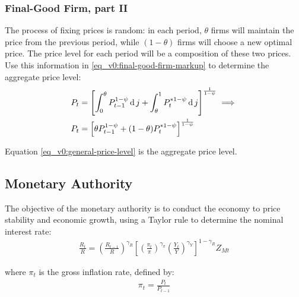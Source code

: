\documentclass[
thesis.tex
]{subfiles}
\begin{document}
	
	\subsubsection{Final-Good Firm, part II}
	
	The process of fixing prices is random: in each period, $\theta$ firms will maintain the price from the previous period, while $(1-\theta)$ firms will choose a new optimal price. The price level for each period will be a composition of these two prices. Use this information in \ref{eq_v0:final-good-firm-markup} to determine the aggregate price level:
	\begin{align}
		P_t & = \left[ \int_{0}^{\theta} P_{t-1}^{1-\psi} \operatorname{d} j + \int_{\theta}^{1} P_t^{\ast 1-\psi} \operatorname{d} j \right]^{\frac{1}{1-\psi}}  \implies \nonumber \\
		P_t & = \left[ \theta P_{t-1}^{1-\psi} + (1-\theta) P_t^{\ast 1-\psi} \right]^\frac{1}{1-\psi} \label{eq_v0:general-price-level}
	\end{align}
	
	Equation \ref{eq_v0:general-price-level} is the aggregate price level.
	
	
	\subsection{Monetary Authority}
	
	The objective of the monetary authority is to conduct the economy to price stability and economic growth, using a Taylor rule \cite{taylor_discretion_1993} to determine the nominal interest rate:
	\begin{align}
		\label{eq_v0:monetary-policy}
		\frac{R_t}{R} =
		\left( \frac{R_{t-1}}{R} \right)^{\gamma_R}  \left[
		\left( \frac{\pi_t}{\pi} \right)^{\gamma_\pi}
		\left( \frac{Y_t}{Y} \right)^{\gamma_Y} \right]^{1-\gamma_R} Z_{Mt}
	\end{align}
	
	where $\pi_t$ is the gross inflation rate, defined by:
	\begin{align}
		\pi_t = \frac{P_t}{P_{t-1}}
		\label{eq_v0:gross-inflation-rate}
	\end{align}
	
\end{document}
